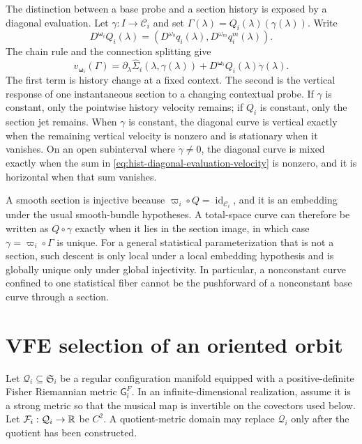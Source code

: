 The distinction between a base probe and a section history is exposed by a
diagonal evaluation.  Let $\gamma:I\to\mathcal C_i$ and set
$\Gamma(\lambda)=Q_i(\lambda)(\gamma(\lambda))$.  Write
\begin{equation}
D^{\boldsymbol\omega_i}Q_i(\lambda)
=\left(D^{\omega_b}q_i(\lambda),D^{\omega_m}q_i^m(\lambda)\right).
\label{eq:hist-product-covariant-section-jet}
\end{equation}
The chain rule and the connection splitting give
\begin{equation}
v_{\boldsymbol\omega_i}(\Gamma)
=\partial_\lambda\widehat\Sigma_i(\lambda,\gamma(\lambda))
+D^{\boldsymbol\omega_i}Q_i(\lambda)\dot\gamma(\lambda).
\label{eq:hist-diagonal-evaluation-velocity}
\end{equation}
The first term is history change at a fixed context.  The second is the
vertical response of one instantaneous section to a changing contextual
probe.  If $\gamma$ is constant, only the pointwise history velocity remains;
if $Q_i$ is constant, only the section jet remains.  When $\gamma$ is
  constant, the diagonal curve is vertical exactly when the remaining vertical
  velocity is nonzero and is stationary when it vanishes.  On an open subinterval where $\dot\gamma\ne0$,
the diagonal curve is mixed exactly when the sum in
\eqref{eq:hist-diagonal-evaluation-velocity} is nonzero, and it is horizontal
when that sum vanishes. 

A smooth section is injective because
$\varpi_i\circ Q=\operatorname{id}_{\mathcal C_i}$, and it is an embedding
under the usual smooth-bundle hypotheses.  A total-space curve can therefore
be written as $Q\circ\gamma$ exactly when it lies in the section image, in
which case $\gamma=\varpi_i\circ\Gamma$ is unique.  For a general statistical
parameterization that is not a section, such descent is only local under a
local embedding hypothesis and is globally unique only under global
injectivity.  In particular, a nonconstant curve confined to one statistical
fiber cannot be the pushforward of a nonconstant base curve through a
section.  

\section{VFE selection of an oriented orbit}
\label{sec:hist-vfe-orbit-selection}

Let $\mathcal Q_i\subseteq\mathfrak S_i$ be a regular configuration manifold
equipped with a positive-definite Fisher Riemannian metric
$\mathsf G_i^F$.  In an infinite-dimensional realization, assume it is a
strong metric so that the musical map is invertible on the covectors used
below.  Let $\mathcal F_i:\mathcal Q_i\to\mathbb R$ be $C^2$.  A quotient-metric
domain may replace $\mathcal Q_i$ only after the quotient has been
constructed.  


